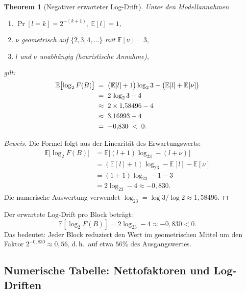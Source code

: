 \documentclass[12pt,a4paper]{article}
\newtheorem{theorem}[definition]{Theorem}
\newenvironment{beweis}{\begin{proof}[Beweis]}{\end{proof}}
\newcommand{\E}{\mathbb{E}}
\newcommand{\logt}{\log_2}        %
\begin{document}
\begin{theorem}[Negativer erwarteter Log-Drift]
\label{thm:neg-drift}
Unter den Modellannahmen
\begin{enumerate}[label=\upshape(\roman*)]
  \item $\Pr[l = k] = 2^{-(k+1)}$, $\E[l] = 1$,
  \item $\nu$ geometrisch auf $\{2,3,4,\ldots\}$ mit $\E[\nu] = 3$,
  \item $l$ und $\nu$ unabhängig (heuristische Annahme),
\end{enumerate}
gilt:
\begin{align}
  \E\bigl[\log_2 F(B)\bigr]
  &\;=\; \bigl(\E[l]+1\bigr)\logt 3 - \bigl(\E[l] + \E[\nu]\bigr) \notag\\
  &\;=\; 2\,\logt 3 - 4 \notag\\
  &\;\approx\; 2 \times 1{,}58496 - 4 \notag\\
  &\;\approx\; 3{,}16993 - 4 \notag\\
  &\;=\; -0{,}830 \;<\; 0. \label{eq:neg-drift}
\end{align}
\end{theorem}

\begin{beweis}
Die Formel folgt aus der Linearität des Erwartungswerts:
\begin{align*}
  \E\bigl[\logt F(B)\bigr]
  &= \E\bigl[(l+1)\logt 3 - (l+\nu)\bigr]\\
  &= (\E[l]+1)\logt 3 - \E[l] - \E[\nu]\\
  &= (1+1)\logt 3 - 1 - 3\\
  &= 2\logt 3 - 4 \approx -0{,}830.
\end{align*}
Die numerische Auswertung verwendet $\logt 3 = \log 3/\log 2 \approx 1{,}58496$.
\end{beweis}

\begin{tcolorbox}[ergebnis, title={Kernergebnis (heuristisch)}]
Der erwartete Log-Drift pro Block beträgt:
\[
  \E[\logt F(B)] = 2\logt 3 - 4 \approx -0{,}830 < 0.
\]
Das bedeutet: Jeder Block reduziert den Wert im geometrischen Mittel um den
Faktor $2^{-0{,}830} \approx 0{,}56$, d.\,h.\ auf etwa $56\%$ des Ausgangswertes.
\end{tcolorbox}

\subsection{Numerische Tabelle: Nettofaktoren und Log-Driften}
\end{document}
